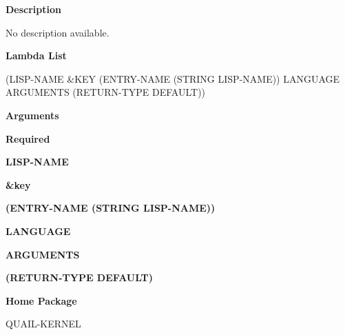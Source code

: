  
{\bf Description}

No description available.

 
{\bf Lambda List}

(LISP-NAME \&KEY (ENTRY-NAME (STRING LISP-NAME)) LANGUAGE ARGUMENTS (RETURN-TYPE DEFAULT))

 
{\bf Arguments}


\beginhang
{\bf Required}\hspace{2em}
 
{\bf LISP-NAME}


 
\endhang
\beginhang
{\bf \&key}\hspace{2em}
 
{\bf (ENTRY-NAME (STRING LISP-NAME))}


 
{\bf LANGUAGE}


 
{\bf ARGUMENTS}


 
{\bf (RETURN-TYPE DEFAULT)}


 
\endhang
 
{\bf Home Package}

QUAIL-KERNEL


